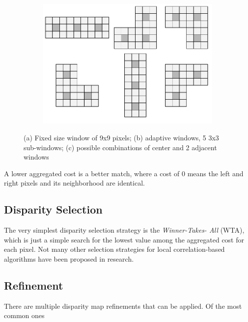 \begin{figure}
\begin{subfigure}[b]{0.20\textwidth}
    \caption{}
  \end{subfigure}
  ~
  \begin{subfigure}[t]{0.40\textwidth}
    \includegraphics[width=\textwidth]{images/adaptive-windows-shapes.pdf}
    \caption{}
  \end{subfigure}
  \caption{(a) Fixed size window of 9x9 pixels; (b) adaptive windows,
    5 3x3 sub-windows; (c) possible combinations of center and 2
    adjacent windows}
\end{figure}


A lower aggregated cost is a better match, where a cost of 0 means the
left and right pixels and its neighborhood are identical.


\subsection{Disparity Selection}
\label{sec:disparity_selection}

The very simplest disparity selection strategy is the \textit{Winner-Takes-
All} (WTA), which is just a simple search for the lowest value among the
aggregated cost for each pixel. Not many other selection strategies for local
correlation-based algorithms have been proposed in research.

\subsection{Refinement}
\label{sec:refinement}

There are multiple disparity map refinements that can be applied. Of the most
common ones

